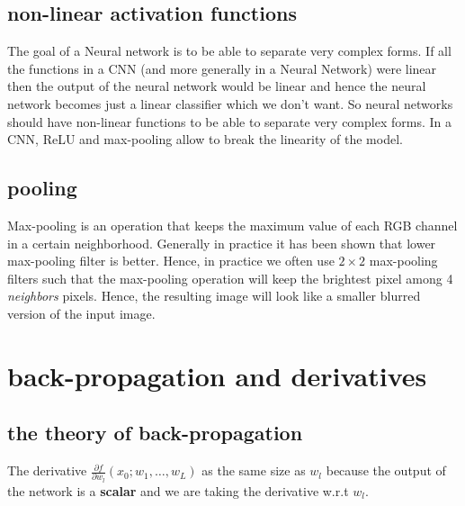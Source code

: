 \documentclass{article}
\begin{document}
\subsection{non-linear activation functions}

The goal of a Neural network is to be able to separate very complex forms. If all the functions in a CNN (and more generally in a Neural Network) were
linear then the output of the neural network would be linear and hence the neural network becomes just a linear classifier which we don't want. So neural networks
should have non-linear functions to be able to separate very complex forms. In a CNN, ReLU and max-pooling allow to break the linearity of the model.

\subsection{pooling}

Max-pooling is an operation that keeps the maximum value of each RGB channel in a certain neighborhood. Generally in practice it has been shown that lower max-pooling filter is better.
Hence, in practice we often use $2 \times 2$ max-pooling filters such that the max-pooling operation will keep the brightest pixel among 4 \textsl{neighbors} pixels. Hence, the resulting image will
look like a smaller blurred version of the input image.


\section{back-propagation and derivatives}
\subsection{the theory of back-propagation}

The derivative $\frac{\partial f}{\partial w_l}(x_0; w_1, \hdots, w_L)$ as the same size as $w_l$ because the output of the network is a \textbf{scalar} and we are taking the derivative w.r.t $w_l$.
\end{document}
